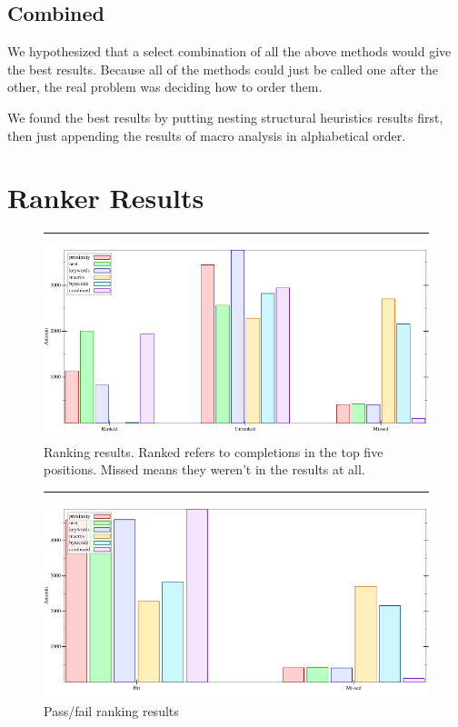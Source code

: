 \documentclass[ms,electronic,twosidetoc,letterpaper,chaptercenter,parttop,lol,lof,lot]{byumsphd}
\begin{document}
\subsection{Combined}

We hypothesized that a select combination of all the above methods would give the best
results. Because all of the methods could just be called one after the other, the real
problem was deciding how to order them.

We found the best results by putting nesting structural heuristics results first, then
just appending the results of macro analysis in alphabetical order.

\section{Ranker Results}

\begin{figure}[h]
\centering
\hrule
\includegraphics[width=1.0\textwidth]{../output/synthesis/ranker/Remove-combined.png}
\caption{Ranking results. Ranked refers to completions in the top five positions. Missed
means they weren't in the results at all.}
\label{ranker-combined}
\end{figure}

\begin{figure}[h]
\centering
\hrule
\includegraphics[width=1.0\textwidth]{../output/synthesis/ranker/Remove-uber-combined.png}
\caption{Pass/fail ranking results}
\label{ranker-uber-combined}
\end{figure}
\end{document}
